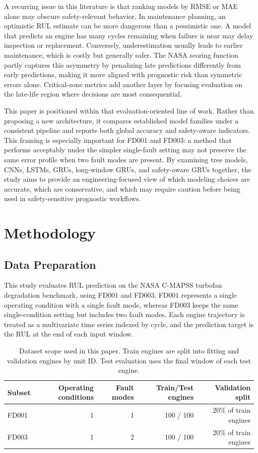 \documentclass[11pt,a4paper]{article}
\begin{document}
A recurring issue in this literature is that ranking models by RMSE or MAE alone may obscure safety-relevant behavior. In maintenance planning, an optimistic RUL estimate can be more dangerous than a pessimistic one. A model that predicts an engine has many cycles remaining when failure is near may delay inspection or replacement. Conversely, underestimation usually leads to earlier maintenance, which is costly but generally safer. The NASA scoring function partly captures this asymmetry by penalizing late predictions differently from early predictions, making it more aligned with prognostic risk than symmetric errors alone. Critical-zone metrics add another layer by focusing evaluation on the late-life region where decisions are most consequential.

This paper is positioned within that evaluation-oriented line of work. Rather than proposing a new architecture, it compares established model families under a consistent pipeline and reports both global accuracy and safety-aware indicators. This framing is especially important for FD001 and FD003: a method that performs acceptably under the simpler single-fault setting may not preserve the same error profile when two fault modes are present. By examining tree models, CNNs, LSTMs, GRUs, long-window GRUs, and safety-aware GRUs together, the study aims to provide an engineering-focused view of which modeling choices are accurate, which are conservative, and which may require caution before being used in safety-sensitive prognostic workflows.

\section{Methodology}

\subsection{Data Preparation}

This study evaluates RUL prediction on the NASA C-MAPSS turbofan degradation benchmark, using FD001 and FD003. FD001 represents a single operating condition with a single fault mode, whereas FD003 keeps the same single-condition setting but includes two fault modes. Each engine trajectory is treated as a multivariate time series indexed by cycle, and the prediction target is the RUL at the end of each input window.

\begin{table}[htbp]
\centering
\caption{Dataset scope used in this paper. Train engines are split into fitting and validation engines by unit ID. Test evaluation uses the final window of each test engine.}
\label{tab:dataset-scope}
\begin{tabular}{lrrrr}
\toprule
Subset & Operating conditions & Fault modes & Train/Test engines & Validation split \\
\midrule
FD001 & 1 & 1 & 100 / 100 & 20\% of train engines \\
FD003 & 1 & 2 & 100 / 100 & 20\% of train engines \\
\bottomrule
\end{tabular}
\end{table}
\end{document}

